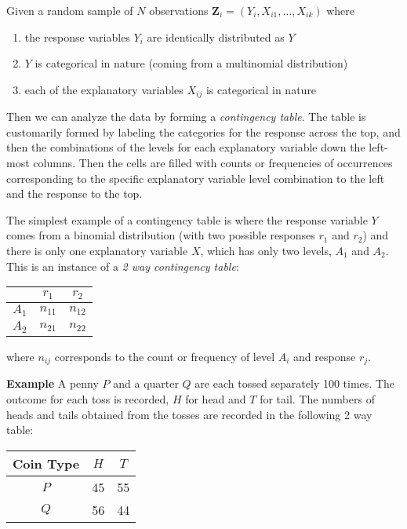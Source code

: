 \documentclass[12pt]{article}
\begin{document}

Given a random sample of $N$ observations $\textbf{Z}_i=(Y_i,X_{i1},\ldots,X_{ik})$ where 
\begin{enumerate}
\item the response variables $Y_i$ are identically distributed as $Y$
\item $Y$ is categorical in nature (coming from a multinomial distribution)
\item each of the explanatory variables $X_{ij}$ is categorical in nature
\end{enumerate}
Then we can analyze the data by forming a \emph{contingency table}.  The table is customarily formed by labeling the categories for the response across the top, and then the combinations of the levels for each explanatory variable down the left-most columns.  Then the cells are filled with counts or frequencies of occurrences corresponding to the specific explanatory variable level combination to the left and the response to the top.  
\par
The simplest example of a contingency table is where the response variable $Y$ comes from a binomial distribution (with two possible responses $r_1$ and $r_2$) and there is only one explanatory variable $X$, which has only two levels, $A_1$ and $A_2$.  This is an instance of a \emph{2 way contingency table}:
\begin{center}
\begin{tabular}{|c|c|c|}
\hline
 & $r_1$ & $r_2$ \\
\hline
$A_1$ & $n_{11}$ & $n_{12}$ \\
\hline
$A_2$ & $n_{21}$ & $n_{22}$ \\
\hline
\end{tabular}
\end{center}
where $n_{ij}$ corresponds to the count or frequency of level $A_i$ and response $r_j$.
\par
\textbf{Example}
A penny $P$ and a quarter $Q$ are each tossed separately 100 times.  The outcome for each toss is recorded, $H$ for head and $T$ for tail.  The numbers of heads and tails obtained from the tosses are recorded in the following 2 way table:
\begin{center}
\begin{tabular}{|c|c|c|}
\hline
Coin Type & $H$ & $T$ \\
\hline
$P$ & 45 & 55 \\
\hline
$Q$ & 56 & 44 \\
\hline
\end{tabular}
\end{center}
\end{document}
